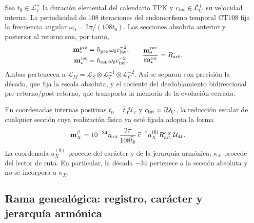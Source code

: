Sea \(t_0\in\mathcal L_T^+\) la duración elemental del calendario TPK y
\(c_{\rm int}\in\mathcal L_C^+\) su velocidad interna. La periodicidad de
108 iteraciones del endomorfismo temporal CT108 fija la frecuencia angular
\(\omega_0=2\pi/(108t_0)\). Las secciones absoluta anterior y posterior al
retorno son, por tanto,
\begin{equation}
 \begin{aligned}
 \mathbf m_\star^{\rm pre}
 &=\boldsymbol\hbar_{\rm pre}\,\omega_0c_{\rm int}^{-2},\\
 \mathbf m_\star^{\rm ret}
 &=\boldsymbol\hbar_{\rm ret}\,\omega_0c_{\rm int}^{-2},
 \end{aligned}
 \qquad
 \frac{\mathbf m_\star^{\rm pre}}
      {\mathbf m_\star^{\rm ret}}=R_{\rm act}.
 \label{eq:secciones-absolutas-masa-autonoma}
\end{equation}
Ambas pertenecen a
\(
 \mathcal L_M=\mathcal L_S\otimes\mathcal L_T^{-1}
 \otimes\mathcal L_C^{-2}
\).
Así se separan con precisión la década, que fija la escala absoluta, y el
cociente del desdoblamiento bidireccional pre-retorno/post-retorno, que
transporta la memoria de la evolución cerrada.

En coordenadas internas positivas
\(t_0=\widehat t_0\mathcal U_T\) y
\(c_{\rm int}=\widehat c\mathcal U_C\), la reducción escalar de cualquier
sección cuya realización física ya esté fijada adopta la forma
\begin{equation}
 \mathbf m_X^\beta
 =10^{-34}\eta_{\rm ret}\,
  \frac{2\pi}{108\widehat t_0}\,\widehat c^{-2}
  a_X^{(0)}R_{\rm act}^{\kappa_X}\,\mathcal U_M .
 \label{eq:ley-escalar-general-masas-autonoma}
\end{equation}
La coordenada \(a_X^{(0)}\) procede del carácter y de la jerarquía armónica;
\(\kappa_X\) procede del lector de ruta. En particular, la década
\(-34\) pertenece a la sección absoluta y no se incorpora a
\(\kappa_X\).

\subsection{Rama genealógica: registro, carácter y jerarquía armónica}

